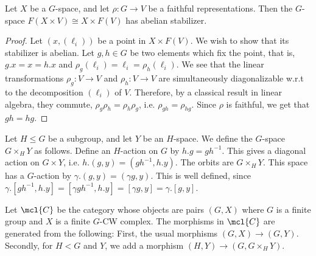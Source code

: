 \begin{proposition}\label{faithful-triv-bundle}
	Let $X$ be a $G$-space, and let $\rho: G \to V$ be a faithful representations.
	Then the $G$-space $F\left(X \times V\right) \cong X \times F\left(V\right)$ has abelian stabilizer.
\end{proposition}

\begin{proof}
	Let $\left(x, \left(\ell_i\right)\right)$ be a point in $X \times F\left(V\right)$.
	We wish to show that its stabilizer is abelian.
	Let $g,h \in G$ be two elements which fix the point, that is, $g.x = x = h.x$ and $\rho_g\left(\ell_i\right) = \ell_i = \rho_h\left(\ell_i\right)$.
	We see that the linear transformations $\rho_g: V \to V$ and $\rho_h: V \to V$ are simultaneously diagonalizable w.r.t to the decomposition $\left(\ell_i\right)$ of $V$.
	Therefore, by a classical result in linear algebra, they commute, $\rho_g \rho_h = \rho_h \rho_g$, i.e. $\rho_{gh} = \rho_{hg}$.
	Since $\rho$ is faithful, we get that $gh = hg$.
\end{proof}

\begin{definition}
	Let $H \leq G$ be a subgroup, and let $Y$ be an $H$-space.
	We define the $G$-space $G \times_H Y$ as follows.
	Define an $H$-action on $G$ by $h.g = gh^{-1}$.
	This gives a diagonal action on $G \times Y$, i.e. $h.\left(g, y\right) = \left(g h^{-1}, h.y\right)$.
	The orbits are $G \times_H Y$.
	This space has a $G$-action by $\gamma. \left(g, y\right) = \left(\gamma g, y\right)$.
	This is well defined, since
	$
	\gamma. \left[g h^{-1}, h.y\right]
	= \left[\gamma g h^{-1}, h.y\right]
	= \left[\gamma g, y\right]
	= \gamma . \left[g, y\right]
	$.
\end{definition}

\begin{definition}
	Let $\mcl{C}$ be the category whose objects are pairs $\left(G, X\right)$ where $G$ is a finite group and $X$ is a finite $G$-CW complex.
	The morphisms in $\mcl{C}$ are generated from the following:
	First, the usual morphisms $\left(G, X\right) \to \left(G, Y\right)$.
	Secondly, for $H < G$ and $Y$, we add a morphism $\left(H, Y\right) \to \left(G, G \times_H Y\right)$.
\end{definition}

